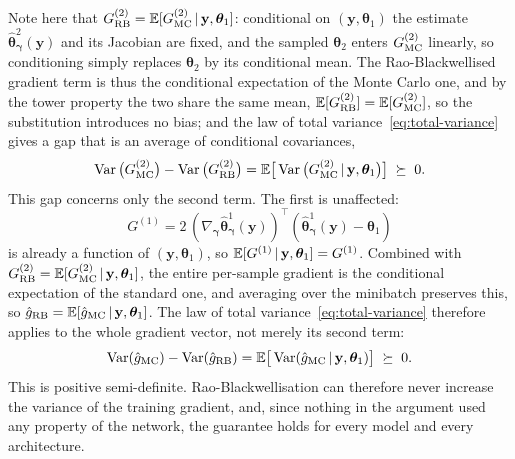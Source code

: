 %
Note here that $G^{(2)}_{\mathrm{RB}}=\mathbb{E}[G_{\mathrm{MC}}^{(2)} \,|\, \mathbf{y}, \bm{\theta}_{1}]$:
conditional on $(\mathbf{y}, \bm{\theta}_1)$ the estimate
$\hat{\bm{\theta}}_{\bm{\gamma}}^{2}(\mathbf{y})$ and its Jacobian are fixed, and
the sampled $\bm{\theta}_2$ enters $G_{\mathrm{MC}}^{(2)}$ linearly, so conditioning
simply replaces $\bm{\theta}_2$ by its conditional mean. The Rao-Blackwellised
gradient term is thus the conditional expectation of the Monte Carlo one, and
by the tower property the two share the same mean,
$\mathbb{E}[G_{\mathrm{RB}}^{(2)}] = \mathbb{E}[G_{\mathrm{MC}}^{(2)}]$, so the substitution introduces no bias;
and the law of total variance~\eqref{eq:total-variance} gives a gap that is an
average of conditional covariances,
%
\begin{equation}
  \operatorname{Var}\big(G_{\mathrm{MC}}^{(2)}\big) - \operatorname{Var}\big(G_{\mathrm{RB}}^{(2)}\big)
  = \mathbb{E}\big[\operatorname{Var}\big(G_{\mathrm{MC}}^{(2)} \,|\, \mathbf{y}, \bm{\theta}_1\big)\big]
  \;\succeq\; 0.
  \label{eq:variance-gap}
\end{equation}
%
This gap concerns only the second term. The first is unaffected:
\[
  G^{(1)} = 2\,(\nabla_{\bm{\gamma}} \hat{\bm{\theta}}_{\bm{\gamma}}^{1}(\mathbf{y}))^{\!\top}
  (\hat{\bm{\theta}}_{\bm{\gamma}}^{1}(\mathbf{y}) - \bm{\theta}_1)
\]
is already a function of $(\mathbf{y}, \bm{\theta}_1)$, so
$\mathbb{E}[G^{(1)} \,|\, \mathbf{y}, \bm{\theta}_1] = G^{(1)}$. Combined with
$G^{(2)}_{\mathrm{RB}} = \mathbb{E}[G^{(2)}_{\mathrm{MC}} \,|\, \mathbf{y}, \bm{\theta}_1]$, the entire
per-sample gradient is the conditional expectation of the standard one, and
averaging over the minibatch preserves this, so
$\hat{g}_{\mathrm{RB}} = \mathbb{E}[\hat{g}_{\mathrm{MC}} \,|\, \mathbf{y}, \bm{\theta}_1]$. The law of
total variance~\eqref{eq:total-variance} therefore applies to the whole gradient
vector, not merely its second term:
%
\begin{equation}
  \operatorname{Var}(\hat{g}_{\mathrm{MC}}) - \operatorname{Var}(\hat{g}_{\mathrm{RB}})
  = \mathbb{E}\big[\operatorname{Var}(\hat{g}_{\mathrm{MC}} \,|\, \mathbf{y}, \bm{\theta}_1)\big]
  \;\succeq\; 0.
  \label{eq:full-variance-gap}
\end{equation}
%
This is positive semi-definite. Rao-Blackwellisation can therefore never
increase the variance of the training gradient, and, since nothing in the
argument used any property of the network, the guarantee holds for every
model and every architecture.

